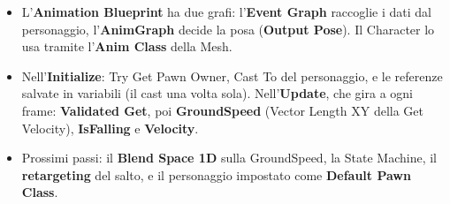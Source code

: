 \begin{itemize}
        keyframe. All'import si controllano gli \textbf{Offset}; le animazioni si
        importano scegliendo lo \textbf{Skeleton}.
  \item L'\textbf{Animation Blueprint} ha due grafi: l'\textbf{Event Graph} raccoglie i
        dati dal personaggio, l'\textbf{Anim\-Graph} decide la posa (\textbf{Output
        Pose}). Il Character lo usa tramite l'\textbf{Anim Class} della Mesh.
  \item Nell'\textbf{Initialize}: Try Get Pawn Owner, Cast To del personaggio, e le
        referenze salvate in variabili (il cast una volta sola). Nell'\textbf{Update},
        che gira a ogni frame: \textbf{Validated Get}, poi \textbf{GroundSpeed} (Vector
        Length XY della Get Velocity), \textbf{IsFalling} e \textbf{Velocity}.
  \item Prossimi passi: il \textbf{Blend Space 1D} sulla GroundSpeed, la State Machine,
        il \textbf{retargeting} del salto, e il personaggio impostato come
        \textbf{Default Pawn Class}.
\end{itemize}
